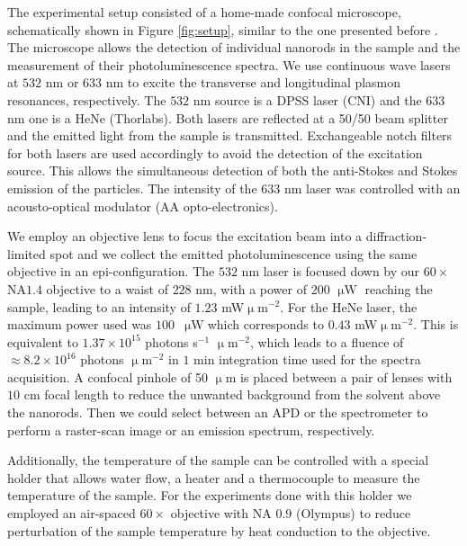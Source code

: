 \documentclass[journal=nalefd,manuscript=letter]{achemso}
\newcommand{\uW}{\ensuremath{\,\upmu\textrm{W}}}
\begin{document}
The experimental setup consisted of a home-made confocal microscope, schematically shown in Figure
\ref{fig:setup}, similar to the one presented before \cite{Carattino2016a}. The microscope allows 
the detection of individual nanorods in the sample and the measurement 
of their photoluminescence spectra. 
We use continuous wave lasers at $532$ nm or $633$ nm to excite the transverse 
and longitudinal plasmon resonances, respectively. The  $532$ nm source is a DPSS 
laser (CNI) and the 633 nm one is a HeNe (Thorlabs). Both lasers are reflected at
 a 50/50 beam splitter and the emitted light from the sample is transmitted. 
Exchangeable notch filters for both lasers are used accordingly to avoid the detection 
of the excitation source. This allows the simultaneous detection of both the anti-Stokes
 and Stokes emission of the particles. The intensity of the $633$ nm laser was 
controlled with an acousto-optical modulator (AA opto-electronics).

We employ an objective lens to focus the excitation beam into a diffraction-limited 
spot and we collect the emitted photoluminescence using the same objective in an epi-configuration. 
The $532$ nm laser is focused down by our $60\times$ NA$1.4$ objective to a waist of $228$ nm, 
with a power of $200\, \uW$ reaching the sample, leading to an intensity of $1.23$ mW$\upmu$m$^{-2}$. 
For the HeNe laser, the maximum power used was $100$ \uW which 
corresponds to $0.43$ mW$\upmu$m$^{-2}$. This is equivalent to $1.37\times10^{15}$ 
photons s$^{-1}$ $\upmu$m$^{-2}$, which leads to a fluence of %
$\approx 8.2\times10^{16}$ photons $\upmu$m$^{-2}$ 
in $1$ %
min integration time used for the spectra acquisition. 
A confocal pinhole of 50 $\upmu$m is placed between a pair of lenses with $10$ cm focal length 
to reduce the unwanted background from the solvent above the nanorods. Then we could 
select between an APD or the spectrometer to perform a raster-scan image or an emission 
spectrum, respectively. %

Additionally, the temperature of the sample can be controlled with a special holder that allows 
water flow, a heater and a thermocouple to measure the temperature of the sample. 
For the experiments done with this holder we employed an air-spaced $60\times$ 
objective with NA $0.9$ (Olympus) to reduce perturbation of the sample temperature by heat 
conduction to the objective.
\end{document}
